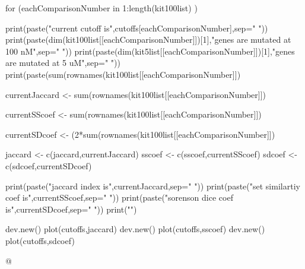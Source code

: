 \documentclass{article}
\begin{document}
for (eachComparisonNumber in 1:length(kit100list) ){
	print(paste("current cutoff is",cutoffs[eachComparisonNumber],sep=" "))
	print(paste(dim(kit100list[[eachComparisonNumber]])[1],"genes are mutated at 100 nM",sep=" "))
	print(paste(dim(kit5list[[eachComparisonNumber]])[1],"genes are mutated at 5 uM",sep=" "))
	print(paste(sum(rownames(kit100list[[eachComparisonNumber]]) %
	
	currentJaccard <- sum(rownames(kit100list[[eachComparisonNumber]]) %
	
	currentSScoef <- sum(rownames(kit100list[[eachComparisonNumber]]) %
	
	currentSDcoef <- (2*sum(rownames(kit100list[[eachComparisonNumber]]) %
	
	jaccard <- c(jaccard,currentJaccard)
	sscoef <- c(sscoef,currentSScoef)
	sdcoef <- c(sdcoef,currentSDcoef)
	
	
	print(paste("jaccard index is",currentJaccard,sep=" "))
	print(paste("set similartiy coef is",currentSScoef,sep=" "))
	print(paste("sorenson dice coef is",currentSDcoef,sep=" "))
	print("")
}
dev.new()
plot(cutoffs,jaccard)
dev.new()
plot(cutoffs,sscoef)
dev.new()
plot(cutoffs,sdcoef)

@
\end{document}

